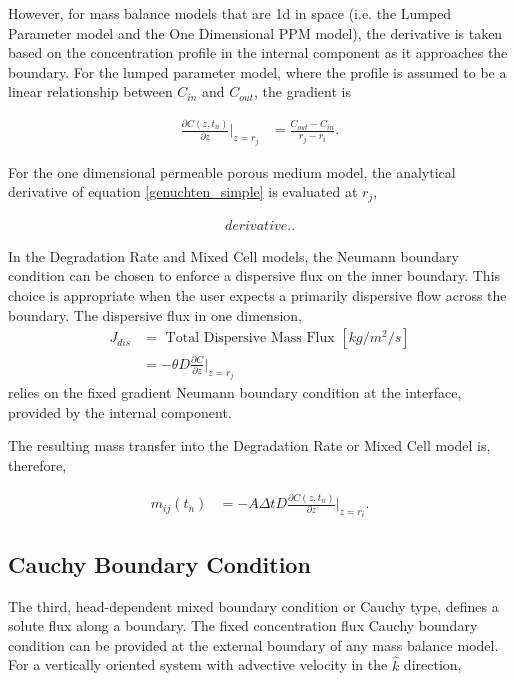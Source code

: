 However, for mass balance models that are 1d in space (i.e. the Lumped Parameter model 
and the One Dimensional PPM model), the derivative is taken based on the 
concentration profile in the internal component as it approaches the boundary. 
For the lumped parameter model, where the profile is assumed to be a linear 
relationship between $C_{in}$ and $C_{out}$, the gradient is

\begin{align} 
\frac{\partial C(z,t_n)}{\partial z}\Bigg|_{z=r_j} &= \frac{C_{out} - C_{in}}{r_{j} - r_{i}}.
\end{align}

For the one dimensional permeable porous medium model, the analytical 
derivative of equation \eqref{genuchten_simple} is evaluated at $r_j$,

\begin{align}
derivative..
\end{align}

In the Degradation Rate and Mixed Cell models, the Neumann boundary condition 
can be chosen to enforce a dispersive flux on the inner boundary. This choice 
is appropriate when the user expects a primarily dispersive flow across the 
boundary.
The dispersive flux in one dimension, 
\begin{align}
      J_{dis} &= \mbox{ Total Dispersive Mass Flux }[kg/m^2/s]\nonumber\\
      &= -\theta D\frac{\partial C}{\partial z}\Big|_{z=r_j} \nonumber
\end{align}
relies on the fixed gradient Neumann boundary condition at the interface, 
provided by the internal component. 

The resulting mass transfer into the Degradation Rate or Mixed Cell model is, 
therefore, 

\begin{align}
m_{ij}(t_n) &= - A\Delta t D \frac{\partial C(z,t_n)}{\partial z}|_{z=r_i}.
\end{align}


\subsection{Cauchy Boundary Condition}

The third, head-dependent mixed boundary condition or Cauchy type, defines a 
solute flux along a boundary.  The fixed concentration flux Cauchy boundary 
condition can be provided at the external boundary of any mass balance model.  
For a vertically oriented system with advective velocity in the $\hat{k}$ 
direction,

